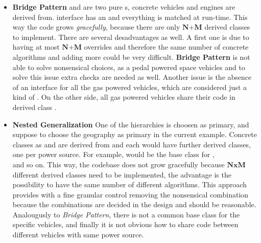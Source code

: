 \begin{itemize}
    \item \textbf{Bridge Pattern} \newline
     and  are two pure 
    s, concrete vehicles and engines are derived from. 
     interface has an  and 
    everything is matched at run-time.
    \newline
    This way the code grows \textit{gracefully}, because there are only 
    $\textbf{N+M}$ derived classes to implement. There are several 
    desadvantages as well. A first one is due to having at most 
    $\textbf{N+M}$ overrides and therefore the same number of concrete 
    algorithms and adding more could be very difficult.
    \newline
    \textbf{Bridge Pattern} is not able to solve nonsensical choices, 
    as a pedal powered space vehicles and to solve this issue extra 
    checks are needed as well.
    \newline
    Another issue is the absence of an interface for all the gas powered 
    vehicles, which are considered just a kind of . 
    On the other side, all gas powered vehicles share their code in 
    derived class .
    
    \item \textbf{Nested Generalization} \newline
    One of the hierarchies is choosen as primary, and suppose to choose 
    the geography as primary in the current example.
    \newline
    Concrete classes as  and  
     are derived from  
    and each would have further derived classes, one per power source. 
    For example,  would be the base class for 
    , \\
     and so on.
    \newline
    This way, the codebase does not grow gracefully because $\textbf{NxM}$ 
    different derived classes need to be implemented, the advantage is 
    the possibility to have the same number of different algorithms.
    \newline 
    This approach provides with a fine granular control removing the 
    nonsensical combination because the combinations are decided in the 
    design and should be reasonable.
    \newline
    Analougusly to \textit{Bridge Pattern}, there is not a common base 
    class for the specific vehicles, and finally it is not obvious how 
    to share code between different vehicles with same power source.


\end{itemize}
